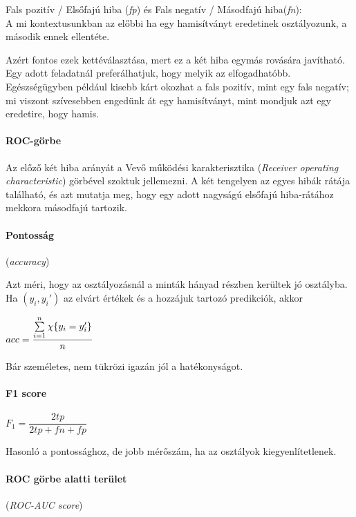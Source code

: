 Fals pozitív / Elsőfajú hiba (\textit{fp}) 
és Fals negatív / Másodfajú hiba(\textit{fn}): \\
A mi kontextusunkban az előbbi ha egy hamisítványt eredetinek
osztályozunk, a második ennek ellentéte.

Azért fontos ezek kettéválasztása, mert ez a két hiba egymás rovására 
javítható. Egy adott feladatnál preferálhatjuk, hogy melyik az elfogadhatóbb.
Egészségügyben például kisebb kárt okozhat a fals pozitív, mint egy fals negatív;
mi viszont szívesebben engedünk át egy hamisítványt, mint mondjuk  azt egy eredetire, hogy hamis.



\paragraph{ROC-görbe}
Az előző két hiba arányát a Vevő működési karakterisztika 
(\textit{Receiver operating characteristic}) 
görbével szoktuk jellemezni. A két tengelyen az egyes hibák 
rátája található, és azt mutatja meg, hogy egy adott nagyságú elsőfajú 
hiba-rátához mekkora másodfajú tartozik.



\paragraph{Pontosság} (\textit{accuracy})

Azt méri, hogy az osztályozásnál a minták hányad részben
kerültek jó osztályba.
Ha $ (y_i, y_i') $ az elvárt értékek és a hozzájuk tartozó 
predikciók, akkor

$ acc = \dfrac{\sum\limits_{{i}=1}^{n} \chi\{y_i = y_i'\}}{n} $ 

Bár személetes, nem tükrözi igazán jól a hatékonyságot.


\paragraph{F1 score} \mbox{} 


$ F_1 = \dfrac{2tp}{2tp + fn + fp} $

\noindent
Hasonló a pontossághoz, de jobb mérőszám, ha az osztályok kiegyenlítetlenek.



\paragraph{ROC görbe alatti terület} (\textit{ROC-AUC score})

